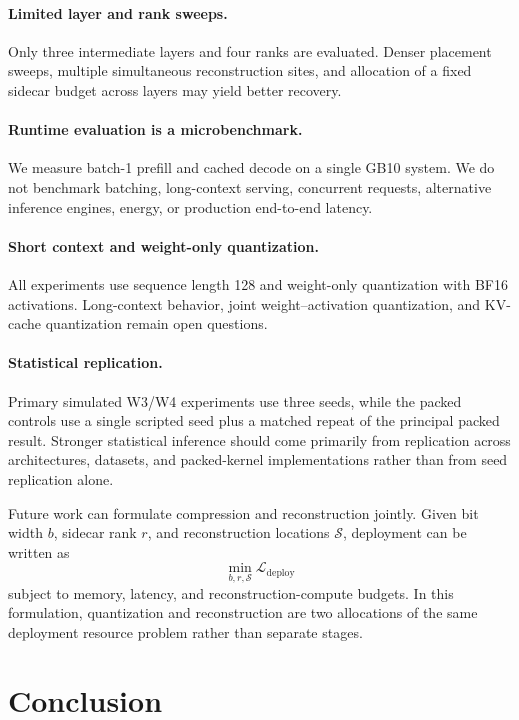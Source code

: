 \documentclass[11pt]{article}
\begin{document}
\paragraph{Limited layer and rank sweeps.}
Only three intermediate layers and four ranks are evaluated. Denser placement sweeps, multiple simultaneous reconstruction sites, and allocation of a fixed sidecar budget across layers may yield better recovery.

\paragraph{Runtime evaluation is a microbenchmark.}
We measure batch-1 prefill and cached decode on a single GB10 system. We do not benchmark batching, long-context serving, concurrent requests, alternative inference engines, energy, or production end-to-end latency.

\paragraph{Short context and weight-only quantization.}
All experiments use sequence length 128 and weight-only quantization with BF16 activations. Long-context behavior, joint weight--activation quantization, and KV-cache quantization remain open questions.

\paragraph{Statistical replication.}
Primary simulated W3/W4 experiments use three seeds, while the packed controls use a single scripted seed plus a matched repeat of the principal packed result. Stronger statistical inference should come primarily from replication across architectures, datasets, and packed-kernel implementations rather than from seed replication alone.

Future work can formulate compression and reconstruction jointly. Given bit width $b$, sidecar rank $r$, and reconstruction locations $\mathcal{S}$, deployment can be written as
\begin{equation}
 \min_{b,r,\mathcal{S}} \mathcal{L}_{\mathrm{deploy}}
\end{equation}
subject to memory, latency, and reconstruction-compute budgets. In this formulation, quantization and reconstruction are two allocations of the same deployment resource problem rather than separate stages.

\section{Conclusion}
\end{document}
